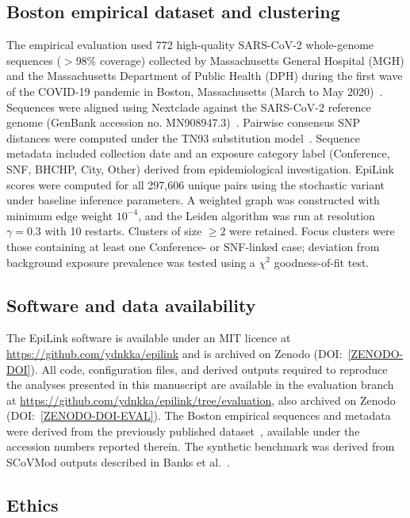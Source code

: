\documentclass[10pt,letterpaper]{article}
\begin{document}
\subsection*{Boston empirical dataset and clustering}

The empirical evaluation used 772 high-quality SARS-CoV-2 whole-genome sequences ($>$98\% coverage) collected by Massachusetts General Hospital (MGH) and the Massachusetts Department of Public Health (DPH) during the first wave of the COVID-19 pandemic in Boston, Massachusetts (March to May 2020)~\cite{Lemieux2021}. Sequences were aligned using Nextclade against the SARS-CoV-2 reference genome (GenBank accession no. MN908947.3)~\cite{Aksamentov2021}. Pairwise consensus SNP distances were computed under the TN93 substitution model~\cite{TamuraNei1993}. Sequence metadata included collection date and an exposure category label (Conference, SNF, BHCHP, City, Other) derived from epidemiological investigation. EpiLink scores were computed for all 297{,}606 unique pairs using the stochastic variant under baseline inference parameters. A weighted graph was constructed with minimum edge weight $10^{-4}$, and the Leiden algorithm was run at resolution $\gamma = 0.3$ with 10 restarts. Clusters of size $\ge 2$ were retained. Focus clusters were those containing at least one Conference- or SNF-linked case; deviation from background exposure prevalence was tested using a $\chi^2$ goodness-of-fit test.

\subsection*{Software and data availability}

The EpiLink software is available under an MIT licence at \url{https://github.com/ydnkka/epilink} and is archived on Zenodo (DOI:~\href{https://doi.org/[ZENODO-DOI]}{[ZENODO-DOI]}). All code, configuration files, and derived outputs required to reproduce the analyses presented in this manuscript are available in the evaluation branch at \url{https://github.com/ydnkka/epilink/tree/evaluation}, also archived on Zenodo (DOI:~\href{https://doi.org/[ZENODO-DOI-EVAL]}{[ZENODO-DOI-EVAL]}). The Boston empirical sequences and metadata were derived from the previously published dataset~\cite{Lemieux2021}, available under the accession numbers reported therein. The synthetic benchmark was derived from SCoVMod outputs described in Banks et al.~\cite{Banks2022}.

\subsection*{Ethics}
\end{document}
